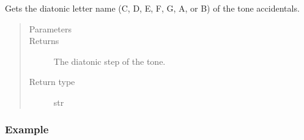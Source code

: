 \documentclass[letterpaper,10pt,english]{sphinxmanual}
\begin{document}
\begin{fulllineitems}
\begin{fulllineitems}
\begin{sphinxVerbatim}[commandchars=\\\{\}]
   
\end{sphinxVerbatim}

\end{fulllineitems}



\begin{fulllineitems}
\sphinxAtStartPar
Gets the diatonic letter name (C, D, E, F, G, A, or B) of the tone  accidentals.
\begin{quote}\begin{description}
\item[{Parameters}] \leavevmode
\sphinxAtStartPar
{} \textendash{} 

\item[{Returns}] \leavevmode
\sphinxAtStartPar
The diatonic step of the tone.

\item[{Return type}] \leavevmode
\sphinxAtStartPar
str

\end{description}\end{quote}
\subsubsection*{Example}

\begin{sphinxVerbatim}[commandchars=\\\{\}]
   
\end{sphinxVerbatim}

\end{fulllineitems}




\end{fulllineitems}
\end{document}
